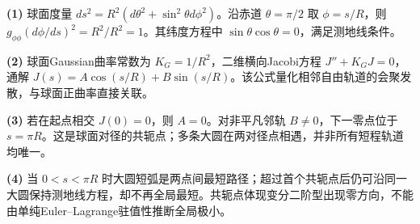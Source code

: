 \par\noindent\textbf{(1)} 球面度量 \(ds^2=R^2(d\theta^2+\sin^2\theta d\phi^2)\)。沿赤道 \(\theta=\pi/2\) 取 \(\phi=s/R\)，则 \(g_{\phi\phi}(d\phi/ds)^2=R^2/R^2=1\)。其纬度方程中 \(\sin\theta\cos\theta=0\)，满足测地线条件。
\par\noindent\textbf{(2)} 球面Gaussian曲率常数为 \(K_G=1/R^2\)，二维横向Jacobi方程 \(J''+K_GJ=0\)，通解 \(J(s)=A\cos(s/R)+B\sin(s/R)\)。该公式量化相邻自由轨道的会聚发散，与球面正曲率直接关联。
\par\noindent\textbf{(3)} 若在起点相交 \(J(0)=0\)，则 \(A=0\)。对非平凡邻轨 \(B\ne0\)，下一零点位于 \(s=\pi R\)。这是球面对径的共轭点；多条大圆在两对径点相遇，并非所有短程轨道均唯一。
\par\noindent\textbf{(4)} 当 \(0<s<\pi R\) 时大圆短弧是两点间最短路径；超过首个共轭点后仍可沿同一大圆保持测地线方程，却不再全局最短。共轭点体现变分二阶型出现零方向，不能由单纯Euler–Lagrange驻值性推断全局极小。
